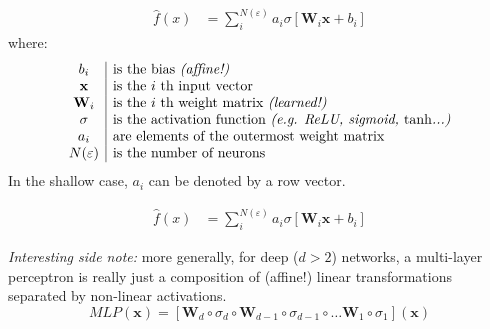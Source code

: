 \begin{frame}
    \begin{align*}
        \hat{f}(x) &=  \sum_i^{N(\varepsilon)} a_i \sigma \left[\mathbf{W}_i \mathbf{x} + b_i \right]
    \end{align*}
    where:
    \[
        \begin{array}{c|l}
            b_i & \text{is the bias \textit{(affine!)}} \\
            \mathbf{x} & \text{is the $i$ th input vector} \\
            \mathbf{W}_i & \text{is the $i$ th weight matrix \textit{(learned!)}} \\
            \sigma & \text{is the activation function \textit{(e.g. ReLU, sigmoid, $\tanh$...)}} \\
            a_i & \text{are elements of the outermost weight matrix} \\
            N(\varepsilon) & \text{is the number of neurons}
        \end{array}
    \]
    In the shallow case, $a_i$ can be denoted by a row vector.
\end{frame}
\begin{frame}
    \begin{align*}
        \hat{f}(x) &=  \sum_i^{N(\varepsilon)} a_i \sigma \left[\mathbf{W}_i \mathbf{x} + b_i \right]
    \end{align*}
\end{frame}
\begin{frame}
    \textit{Interesting side note:}
    more generally, for deep ($d > 2$) networks, a multi-layer perceptron is
    really just a composition of (affine!) linear transformations separated by non-linear
    activations.
    \[
        MLP(\mathbf{x}) = \left[
            \mathbf{W}_d \circ \sigma_d \circ
            \mathbf{W}_{d-1} \circ \sigma_{d-1} \circ
                \ldots
            \mathbf{W}_{1} \circ \sigma_{1} 
        \right] (\mathbf{x} )
    \]
\end{frame}
